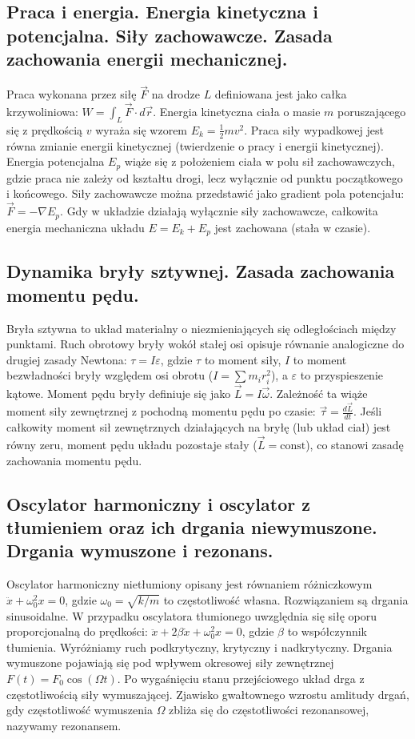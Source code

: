\documentclass[11pt,a4paper]{article}
\begin{document}
\subsection{Praca i energia. Energia kinetyczna i potencjalna. Siły zachowawcze. Zasada zachowania energii mechanicznej.}
Praca wykonana przez siłę $\vec{F}$ na drodze $L$ definiowana jest jako całka krzywoliniowa: $W = \int_{L} \vec{F} \cdot d\vec{r}$. Energia kinetyczna ciała o masie $m$ poruszającego się z prędkością $v$ wyraża się wzorem $E_k = \frac{1}{2}mv^2$. Praca siły wypadkowej jest równa zmianie energii kinetycznej (twierdzenie o pracy i energii kinetycznej). Energia potencjalna $E_p$ wiąże się z położeniem ciała w polu sił zachowawczych, gdzie praca nie zależy od kształtu drogi, lecz wyłącznie od punktu początkowego i końcowego. Siły zachowawcze można przedstawić jako gradient pola potencjału: $\vec{F} = -\nabla E_p$. Gdy w układzie działają wyłącznie siły zachowawcze, całkowita energia mechaniczna układu $E = E_k + E_p$ jest zachowana (stała w czasie).

\subsection{Dynamika bryły sztywnej. Zasada zachowania momentu pędu.}
Bryła sztywna to układ materialny o niezmieniających się odległościach między punktami. Ruch obrotowy bryły wokół stałej osi opisuje równanie analogiczne do drugiej zasady Newtona: $\tau = I \varepsilon$, gdzie $\tau$ to moment siły, $I$ to moment bezwładności bryły względem osi obrotu ($I = \sum m_i r_i^2$), a $\varepsilon$ to przyspieszenie kątowe. Moment pędu bryły definiuje się jako $\vec{L} = I\vec{\omega}$. Zależność ta wiąże moment siły zewnętrznej z pochodną momentu pędu po czasie: $\vec{\tau} = \frac{d\vec{L}}{dt}$. Jeśli całkowity moment sił zewnętrznych działających na bryłę (lub układ ciał) jest równy zeru, moment pędu układu pozostaje stały ($\vec{L} = \text{const}$), co stanowi zasadę zachowania momentu pędu.

\subsection{Oscylator harmoniczny i oscylator z tłumieniem oraz ich drgania niewymuszone. Drgania wymuszone i rezonans.}
Oscylator harmoniczny nietłumiony opisany jest równaniem różniczkowym $\ddot{x} + \omega_0^2 x = 0$, gdzie $\omega_0 = \sqrt{k/m}$ to częstotliwość własna. Rozwiązaniem są drgania sinusoidalne. W przypadku oscylatora tłumionego uwzględnia się siłę oporu proporcjonalną do prędkości: $\ddot{x} + 2\beta\dot{x} + \omega_0^2 x = 0$, gdzie $\beta$ to współczynnik tłumienia. Wyróżniamy ruch podkrytyczny, krytyczny i nadkrytyczny. Drgania wymuszone pojawiają się pod wpływem okresowej siły zewnętrznej $F(t) = F_0 \cos(\Omega t)$. Po wygaśnięciu stanu przejściowego układ drga z częstotliwością siły wymuszającej. Zjawisko gwałtownego wzrostu amlitudy drgań, gdy częstotliwość wymuszenia $\Omega$ zbliża się do częstotliwości rezonansowej, nazywamy rezonansem.
\end{document}
